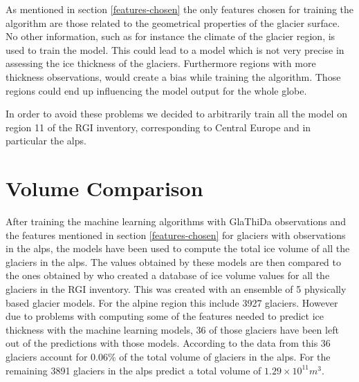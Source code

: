 As mentioned in section \ref{features-chosen} the only features chosen for training the algorithm are those related to the geometrical properties of the glacier surface. No other information, such as for instance the climate of the glacier region, is used to train the model. This could lead to a model which is not very precise in assessing the ice thickness of the glaciers. Furthermore regions with more thickness observations, would create a bias while training the algorithm. Those regions could end up influencing the model output for the whole globe.

In order to avoid these problems we decided to arbitrarily train all the model on region 11 of the RGI inventory, corresponding to Central Europe and in particular the alps. 

\section{Volume Comparison}
After training the machine learning algorithms with GlaThiDa observations and the features mentioned in section \ref{features-chosen} for glaciers with observations in the alps, the models have been used to compute the total ice volume of all the glaciers in the alps. The values obtained by these models are then compared to the ones obtained by \citet{Farinotti2019} who created a database of ice volume values for all the glaciers in the RGI inventory. This was created with an ensemble of 5 physically based glacier models. For the alpine region this include 3927 glaciers. However due to problems with computing some of the features needed to predict ice thickness with the machine learning models, 36 of those glaciers have been left out of the predictions with those models. According to the data from \citet{Farinotti2019} this 36 glaciers account for 0.06\% of the total volume of glaciers in the alps. For the remaining 3891 glaciers in the alps \citet{Farinotti2019} predict a total volume of $1.29\times 10^{11}m^3$.

